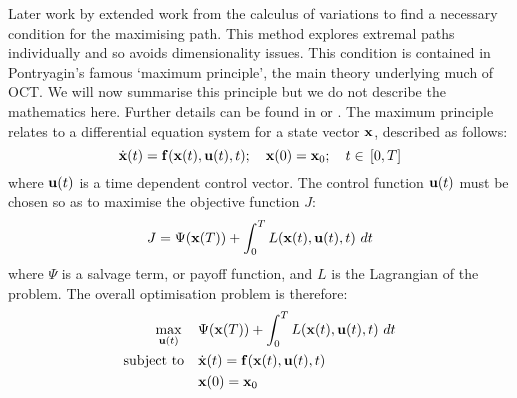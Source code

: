 Later work by \citet{pontryagin_mathematical_1962} extended work from the calculus of variations to find a necessary condition for the maximising path. This method explores extremal paths individually and so avoids dimensionality issues. This condition is contained in Pontryagin's famous `maximum principle', the main theory underlying much of OCT. We will now summarise this principle but we do not describe the mathematics here. Further details can be found in \citet{lenhart_optimal_2007} or \citet{hocking_optimal_1991}. The maximum principle relates to a differential equation system for a state vector $\mathbf{\bm{x}}$, described as follows:
\begin{equation}
    \dot{\mathbf{\bm{x}}}(t) = \mathbf{\bm{f}}(\mathbf{\bm{x}}(t), \mathbf{\bm{u}}(t), t);\quad{}\mathbf{\bm{x}}(0)=\mathbf{\bm{x}}_0;\quad{}t\in{}\left[0, T\right]
\end{equation}
where $\mathbf{\bm{u}}(t)$ is a time dependent control vector. The control function $\mathbf{\bm{u}}(t)$ must be chosen so as to maximise the objective function $J$:
\begin{equation}
    J = \Psi{}(\mathbf{\bm{x}}(T)) + \int_0^TL(\mathbf{\bm{x}}(t), \mathbf{\bm{u}}(t), t)\,\mathop{dt}
\end{equation}
where $\Psi$ is a salvage term, or payoff function, and $L$ is the Lagrangian of the problem. The overall optimisation problem is therefore:
\begin{subequations}\label{eqn:ch2:opt_problem}
    \begin{align}
        \max_{\vect{u}(t)} \quad{} &\null \Psi{}(\vect{x}(T)) + \int_0^TL(\vect{x}(t), \vect{u}(t), t)\,\mathop{dt} \label{eqn:ch2:opt_problem_a}\\
        \text{subject to} \quad{} &\null \dot{\vect{x}}(t) = \vect{f}(\vect{x}(t), \vect{u}(t), t) \label{eqn:ch2:opt_problem_b}\\
        &\null \vect{x}(0)=\vect{x}_0 \label{eqn:ch2:opt_problem_c}
    \end{align}
\end{subequations}

